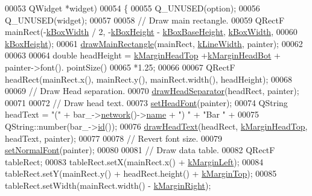 \begin{DoxyCode}
00053                     QWidget *widget)
00054 \{
00055   Q\_UNUSED(option);
00056   Q\_UNUSED(widget);
00057 
00058   \textcolor{comment}{// Draw main rectangle.}
00059   QRectF mainRect(-\hyperlink{class_info_bar_a58f7773f4265d7e759f2eeb4c9aac48d}{kBoxWidth} / 2, -\hyperlink{class_info_bar_aedf2e766968ea9ba3e691f24efb8c117}{kBoxHeight} - 
      \hyperlink{class_info_bar_a0f2f7b614000ae1d317ec3819acabbf2}{kBoxBaseHeight}, \hyperlink{class_info_bar_a58f7773f4265d7e759f2eeb4c9aac48d}{kBoxWidth},
00060                   \hyperlink{class_info_bar_aedf2e766968ea9ba3e691f24efb8c117}{kBoxHeight});
00061   \hyperlink{class_info_bar_a5d5440d1ca77a5366e51ac9e6f6aa4d3}{drawMainRectangle}(mainRect, \hyperlink{class_info_bar_a9592abdb63cc3cfffc6e5826f998a353}{kLineWidth}, painter);
00062 
00063 
00064   \textcolor{keywordtype}{double} headHeight = \hyperlink{class_info_bar_ae4ec64a4c58d29eb6c7378b4621bc6c2}{kMarginHeadTop} +\hyperlink{class_info_bar_aed15b9f28cc4a43d509c3553b032fa5e}{kMarginHeadBot} + painter->font().
      pointSize()
00065                       *1.25;
00066 
00067   QRectF headRect(mainRect.x(), mainRect.y(), mainRect.width(), headHeight);
00068 
00069   \textcolor{comment}{// Draw Head separation.}
00070   \hyperlink{class_info_bar_a9b89dc7229ecee097d9ca9c4e6fa38f2}{drawHeadSeparator}(headRect, painter);
00071 
00072   \textcolor{comment}{// Draw head text.}
00073   \hyperlink{class_info_bar_a9d49c5f446e209ac2a99f48991040745}{setHeadFont}(painter);
00074   QString headText = \textcolor{stringliteral}{"("} + bar\_->\hyperlink{group___models_gab0594d5d7313e8749bb85434b255db9a}{network}()->\hyperlink{class_network_ab6643733a517f930c60b06f5ffd78186}{name} + \textcolor{stringliteral}{") "} + \textcolor{stringliteral}{"Bar "} +
00075                      QString::number(bar\_->\hyperlink{group___models_gacf0fb781a73856bb7beb823304465e13}{id}());
00076   \hyperlink{class_info_bar_a912f4b2babec3df1aad3d31bc54a6e34}{drawHeadText}(headRect, \hyperlink{class_info_bar_ae4ec64a4c58d29eb6c7378b4621bc6c2}{kMarginHeadTop}, headText, painter);
00077 
00078   \textcolor{comment}{// Revert font size.}
00079   \hyperlink{class_info_bar_a2bfda27ec3d1ae6b4b1c927876f594c1}{setNormalFont}(painter);
00080 
00081   \textcolor{comment}{// Draw data table.}
00082   QRectF tableRect;
00083   tableRect.setX(mainRect.x() + \hyperlink{class_info_bar_a2ed246fc7b7917ba8141b55cbd023d5c}{kMarginLeft});
00084   tableRect.setY(mainRect.y() + headRect.height() + \hyperlink{class_info_bar_a810c3286fc4d960d04ffbd31318ebff2}{kMarginTop});
00085   tableRect.setWidth(mainRect.width() - \hyperlink{class_info_bar_aa16c67708cd2ab938e1dc8be5f168614}{kMarginRight});

\end{DoxyCode}
